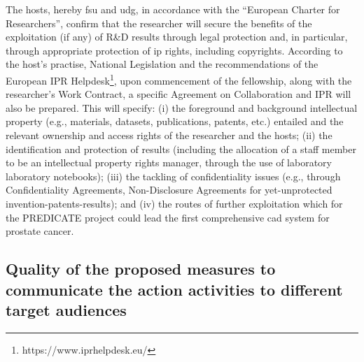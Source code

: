 The hosts, hereby \ac{fsu} and \ac{udg}, in accordance with the ``European Charter for Researchers'', confirm that the researcher will secure the benefits of the exploitation (if any) of R\&D results through legal protection and, in particular, through appropriate protection of \ac{ip} rights, including copyrights. According to the host's practise, National Legislation and the recommendations of the European IPR Helpdesk\footnote{https://www.iprhelpdesk.eu/}, upon commencement of the fellowship, along with the researcher's Work Contract, a specific Agreement on Collaboration and IPR will also be prepared. This will specify: (i) the foreground and background intellectual property (e.g., materials, datasets, publications, patents, etc.) entailed and the relevant ownership and access rights of the researcher and the hosts; (ii) the identification and protection of results (including the allocation of a staff member to be an intellectual property rights manager, through the use of laboratory laboratory notebooks); (iii) the tackling of confidentiality issues (e.g., through Confidentiality Agreements, Non-Disclosure Agreements for yet-unprotected invention-patents-results); and (iv) the routes of further exploitation which for the PREDICATE project could lead the first comprehensive \ac{cad} system for prostate cancer.




\subsection{Quality of the proposed measures to communicate the action activities to different target audiences}

